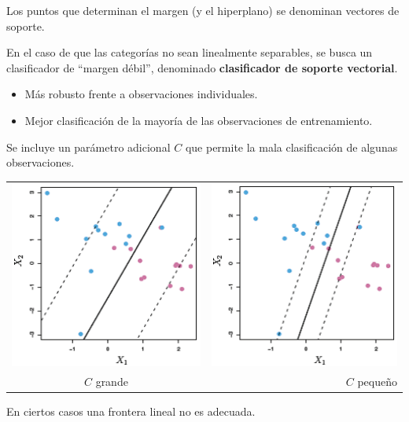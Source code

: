\documentclass[]{book}
\begin{document}
Los puntos que determinan el margen (y el hiperplano) se denominan
vectores de soporte.

En el caso de que las categorías no sean linealmente separables, se
busca un clasificador de ``margen débil'', denominado
\textbf{clasificador de soporte vectorial}.

\begin{itemize}
\item
  Más robusto frente a observaciones individuales.
\item
  Mejor clasificación de la mayoría de las observaciones de
  entrenamiento.
\end{itemize}

Se incluye un parámetro adicional \(C\) que permite la mala
clasificación de algunas observaciones.

\begin{longtable}[]{@{}cr@{}}
\toprule
\includegraphics{images/svm2.png} &
\includegraphics{images/svm3.png}\tabularnewline
\(C\) grande & \(C\) pequeño\tabularnewline
\bottomrule
\end{longtable}

En ciertos casos una frontera lineal no es adecuada.
\end{document}
